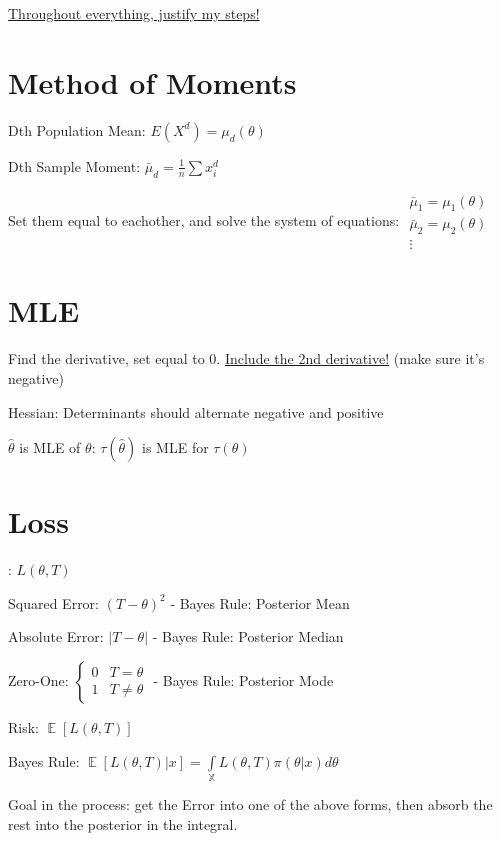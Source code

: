 \documentclass{article}
\DeclareMathOperator{\EX}{\mathbb{E}} %
\let\Oldint=\int
\let\Oldsum=\sum
\renewcommand{\int}{\Oldint\limits}
\renewcommand{\sum}{\Oldsum\limits}
\begin{document}

\underline{Throughout everything, justify my steps!}

\section{Method of Moments}

Dth Population Mean: $E(X^d) = \mu_d(\theta)$

Dth Sample Moment: $\bar{\mu}_d = \frac{1}{n}\sum x_i^d$

Set them equal to eachother, and solve the system of equations: $\begin{matrix} \bar{\mu}_1 = \mu_1(\theta) \\ \bar{\mu}_2 = \mu_2(\theta) \\ \vdots \end{matrix}$

\section{MLE}

Find the derivative, set equal to 0. \underline{Include the 2nd derivative!} (make sure it's negative)

Hessian: Determinants should alternate negative and positive

$\hat{\theta}$ is MLE of $\theta$: $\tau(\hat{\theta})$ is MLE for $\tau(\theta)$

\section{Loss}: $L(\theta, T)$

Squared Error: $(T-\theta)^2$  - Bayes Rule: Posterior Mean

Absolute Error: $|T - \theta|$ - Bayes Rule: Posterior Median

Zero-One: $\begin{cases} 0 & T = \theta \\ 1 & T \neq \theta \end{cases}$ - Bayes Rule: Posterior Mode

Risk: $\EX[L(\theta, T)]$

Bayes Rule: $\EX[L(\theta, T)|x] = \int_{\mathbb{X}} L(\theta, T)\pi(\theta|x)d\theta$

Goal in the process: get the Error into one of the above forms, then absorb the rest into the posterior in the integral.
\end{document}
